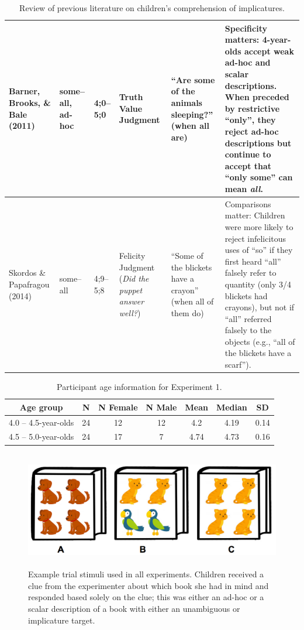 \documentclass[man]{apa2}
\begin{document}
{\begin{landscape}
\begin{table}[!ht]
\begin{tabular}{| p{2.2cm} | p{2cm} | p{1.69cm} | p{4.5cm} | p{5cm} | p{7.2cm} |}
Barner, Brooks, \& Bale (2011) & some--all, ad-hoc & 4;0--5;0 &Truth Value Judgment & ``Are some of the animals sleeping?'' (when all are) & Specificity matters: 4-year-olds accept weak ad-hoc and scalar descriptions. When preceded by restrictive ``only'', they reject ad-hoc descriptions but continue to accept that ``only some'' can mean \emph{all}.\\ \hline
\parbox[t]{2.2cm}{Skordos \&\\Papafragou (2014)} & some--all & 4;9--5;8 & Felicity Judgment (\textit{Did the puppet answer well?}) & ``Some of the blickets have a crayon'' (when all of them do)  & Comparisons matter: Children were more likely to reject infelicitous uses of ``so'' if they first heard ``all'' falsely refer to quantity (only 3/4 blickets had crayons), but not if ``all'' referred falsely to the objects (e.g., ``all of the blickets have a scarf'').\\ \hline \end{tabular}
\caption{\label{tab:lit_review}Review of previous literature on children's comprehension of implicatures.}
\end{table}
\end{landscape}
\restoregeometry

\begin{table}[tb]
\centering
\begin{tabular}{ccccccc}
\hline
{\bf Age group} & {\bf N} & {\bf N Female} & {\bf N Male} & {\bf Mean} & {\bf Median} & {\bf SD} \\
\hline
4.0 -- 4.5-year-olds & 24 & 12 & 12 & 4.2 & 4.19 & 0.14 \\
4.5 -- 5.0-year-olds & 24 & 17 & 7 & 4.74 & 4.73 & 0.16\\
\hline
\end{tabular}
\caption{\label{tab:exp_1_demo}Participant age information for Experiment 1.}
\end{table}

\begin{figure}
 \begin{center}
  \includegraphics[height=2in]{figures/implicatures_demo_letters.png}
  \caption{\label{fig:demo} Example trial stimuli used in all experiments. Children received a clue from the experimenter about which book she had in mind and responded based solely on the clue; this was either an ad-hoc or a scalar description of a book with either an unambiguous or implicature target.}
 \end{center}
\end{figure}

}
\end{document}
